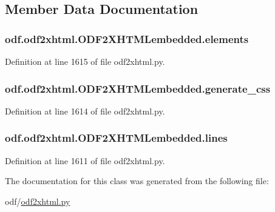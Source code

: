 \subsection{Member Data Documentation}
\hypertarget{classodf_1_1odf2xhtml_1_1ODF2XHTMLembedded_ad727c7214206007cac1568a02aec4831}{
\subsubsection[{elements}]{\setlength{\rightskip}{0pt plus 5cm}odf.\+odf2xhtml.\+O\+D\+F2\+X\+H\+T\+M\+Lembedded.\+elements}}\label{classodf_1_1odf2xhtml_1_1ODF2XHTMLembedded_ad727c7214206007cac1568a02aec4831}


Definition at line 1615 of file odf2xhtml.\+py.

\hypertarget{classodf_1_1odf2xhtml_1_1ODF2XHTMLembedded_a0271b378d97423c436f51aef5ea2f23e}{
\subsubsection[{generate\+\_\+css}]{\setlength{\rightskip}{0pt plus 5cm}odf.\+odf2xhtml.\+O\+D\+F2\+X\+H\+T\+M\+Lembedded.\+generate\+\_\+css}}\label{classodf_1_1odf2xhtml_1_1ODF2XHTMLembedded_a0271b378d97423c436f51aef5ea2f23e}


Definition at line 1614 of file odf2xhtml.\+py.

\hypertarget{classodf_1_1odf2xhtml_1_1ODF2XHTMLembedded_aac8ee539c2c420fadc3947e39b50d8da}{
\subsubsection[{lines}]{\setlength{\rightskip}{0pt plus 5cm}odf.\+odf2xhtml.\+O\+D\+F2\+X\+H\+T\+M\+Lembedded.\+lines}}\label{classodf_1_1odf2xhtml_1_1ODF2XHTMLembedded_aac8ee539c2c420fadc3947e39b50d8da}


Definition at line 1611 of file odf2xhtml.\+py.



The documentation for this class was generated from the following file\+:\begin{DoxyCompactItemize}
\item 
odf/\hyperlink{odf2xhtml_8py}{odf2xhtml.\+py}\end{DoxyCompactItemize}

